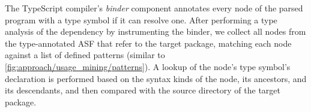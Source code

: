 \documentclass[a4paper,twoside]{article}
\newlength{\pfull}  \setlength{\pfull}  {2mm}
\begin{document}
The TypeScript compiler's \emph{binder} component annotates every node of the parsed program with a type symbol if it can resolve one.
After performing a type analysis of the dependency by instrumenting the binder, we collect all nodes from the type-annotated ASF that refer to the target package,
matching each node against a list of defined patterns (similar to \cref{fig:approach/usage_mining/patterns}).
A lookup of the node's type symbol's declaration is performed based on the syntax kinds of the node, its ancestors, and its descendants, and then compared with the source directory of the target package.

\begin{figure}[t] %
\end{figure}
\end{document}
